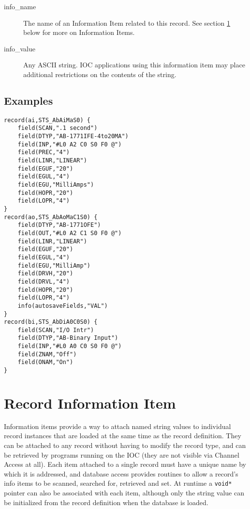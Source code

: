 \begin{description}
\item [info\_name] The name of an Information Item related to this record.
See section \ref{Record Information Item} below for more on Information Items.

\item [info\_value] Any ASCII string.
IOC applications using this information item may place additional restrictions on the contents of the string.

\end{description}

\subsection{Examples}

\begin{verbatim}
record(ai,STS_AbAiMaS0) {
    field(SCAN,".1 second")
    field(DTYP,"AB-1771IFE-4to20MA")
    field(INP,"#L0 A2 C0 S0 F0 @")
    field(PREC,"4")
    field(LINR,"LINEAR")
    field(EGUF,"20")
    field(EGUL,"4")
    field(EGU,"MilliAmps")
    field(HOPR,"20")
    field(LOPR,"4")
}
record(ao,STS_AbAoMaC1S0) {
    field(DTYP,"AB-1771OFE")
    field(OUT,"#L0 A2 C1 S0 F0 @")
    field(LINR,"LINEAR")
    field(EGUF,"20")
    field(EGUL,"4")
    field(EGU,"MilliAmp")
    field(DRVH,"20")
    field(DRVL,"4")
    field(HOPR,"20")
    field(LOPR,"4")
    info(autosaveFields,"VAL")
}
record(bi,STS_AbDiA0C0S0) {
    field(SCAN,"I/O Intr")
    field(DTYP,"AB-Binary Input")
    field(INP,"#L0 A0 C0 S0 F0 @")
    field(ZNAM,"Off")
    field(ONAM,"On")
}
\end{verbatim}

\section{Record Information Item}
\label{Record Information Item}

Information items provide a way to attach named string values to individual record instances that are loaded at the same time as the record definition.
They can be attached to any record without having to modify the record type, and can be retrieved by programs running on the IOC (they are not visible via Channel Access at all).
Each item attached to a single record must have a unique name by which it is addressed, and database access provides routines to allow a record's info items to be scanned, searched for, retrieved and set.
At runtime a \verb|void*| pointer can also be associated with each item, although only the string value can be initialized from the record definition when the database is loaded.

